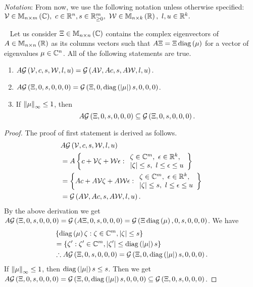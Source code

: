 \emph{Notation}:  From now, we use the following notation unless
otherwise specified:
%
$
{\mathcal{V}\in\mathbb{M}_{n\times m}\left(\mathbb{C}\right)},~{c\in\mathbb{R}^n},{s\in\mathbb{R}_{\geq 0}^m},~\mathcal{W}\in\mathbb{M}_{n\times k}\left(\mathbb{R}\right),~{l,u\in\mathbb{R}^k}.
$
%
\begin{lemma}~\label{lem:lintransform}
Let us consider $\Xi\in\mathbb{M}_{n\times n}\left(\mathbb{C}\right)$ contains the complex
eigenvectors of $A\in\mathbb{M}_{n\times n}\left(\mathbb{R}\right)$ as its columns vectors such
that $A\Xi=\Xi\operatorname{diag}\left(\mu\right)$ for a vector of eigenvalues
$\mu\in\mathbb{C}^n$.  All of the following statements are true.
%
\begin{enumerate}
\item
  $A\mathcal{G}\left(\mathcal{V},c,s,\mathcal{W},l,u\right)=\mathcal{G}\left(A\mathcal{V},Ac,s,A\mathcal{W},l,u\right)$.
\item
  $A\mathcal{G}\left(\Xi,0,s,0,0,0\right)=\mathcal{G}\left(\Xi,0,\operatorname{diag}\left(\left|\mu\right|\right)s,0,0,0\right)$.
\item If $\left\|\mu\right\|_{\infty}\leq 1$, then
  \[A\mathcal{G}\left(\Xi,0,s,0,0,0\right)\subseteq\mathcal{G}\left(\Xi,0,s,0,0,0\right).\]
\end{enumerate}
%
\end{lemma}
%
\begin{proof}
The proof of first statement is derived as follows.
%
\begin{align*}
& A\mathcal{G}\left(\mathcal{V},c,s,\mathcal{W},l,u\right)\\
& = A\left\{
  c+\mathcal{V}\zeta+\mathcal{W}\epsilon:
  \begin{array}{l}
    \zeta\in\mathbb{C}^m,~\epsilon\in\mathbb{R}^k,\\
    \left|\zeta\right|\leq
    s,~l\leq\epsilon\leq u
   \end{array}
  \right\}\\
& = \left\{
  Ac+A\mathcal{V}\zeta+A\mathcal{W}\epsilon:
  \begin{array}{l}
    \zeta\in\mathbb{C}^m,~\epsilon\in\mathbb{R}^k,\\
    \left|\zeta\right|\leq
    s,~l\leq\epsilon\leq u
   \end{array}
  \right\}\\
& = \mathcal{G}\left(A\mathcal{V},Ac,s,A\mathcal{W},l,u\right).
\end{align*}
%
By the above derivation we get
$A\mathcal{G}\left(\Xi,0,s,0,0,0\right)=\mathcal{G}\left(A\Xi,0,s,0,0,0\right)=\mathcal{G}\left(\Xi\operatorname{diag}\left(\mu\right),0,s,0,0,0\right)$.
We have
%
\begin{align*}
& \left\{\operatorname{diag}\left(\mu\right)\zeta:\zeta\in\mathbb{C}^m,\left|\zeta\right|\leq
    s\right\}\\
& =\left\{\zeta^\prime:\zeta^\prime\in\mathbb{C}^m,\left|\zeta^\prime\right|\leq\operatorname{diag}\left(\left|\mu\right|\right)s\right\}\\
& \therefore
  A\mathcal{G}\left(\Xi,0,s,0,0,0\right)=\mathcal{G}\left(\Xi,0,\operatorname{diag}\left(\left|\mu\right|\right)s,0,0,0\right).
\end{align*}
%
If $\left\|\mu\right\|_{\infty}\leq 1$, then $\operatorname{diag}\left(\left|\mu\right|\right){s}\leq
s$.  Then we get
$A\mathcal{G}\left(\Xi,0,s,0,0,0\right)=\mathcal{G}\left(\Xi,0,\operatorname{diag}\left(\left|\mu\right|\right)s,0,0,0\right)\subseteq\mathcal{G}\left(\Xi,0,s,0,0,0\right)$.
\end{proof}
